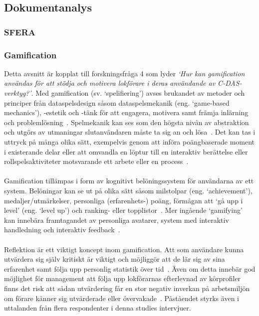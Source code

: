\subsection{Dokumentanalys}\label{subsec:dokumentanalys}
\subsubsection{SFERA}
\lipsum[1]
\subsubsection{Gamification}
Detta avsnitt är kopplat till forskningsfråga 4 som lyder \emph{\lq{}Hur kan gamification användas för att stödja och motivera lokförare i deras användande av C-DAS-verktyg?\rq{}}.
Med gamification (sv. \lq{}spelifiering\rq{}) avses brukandet av metoder och principer från dataspelsdesign såsom dataspelsmekanik (eng. \lq{}game-based mechanics\rq{}), -estetik och -tänk för att engagera, motivera samt främja inlärning och problemlösning~\cite{Bae2014, Cwil2018}.
Spelmekanik kan ses som den högsta nivån av abstraktion och utgörs av utmaningar slutanvändaren måste ta sig an och lösa~\cite{Cwil2018}.
Det kan tas i uttryck på många olika sätt, exempelvis genom att införa poängbaserade moment i existerande delar eller att omvandla en löptur till en interaktiv berättelse eller rollspelsaktiviteter motsvarande ett arbete eller en process~\cite{Bae2014}.
\paragraph{}
\hspace{-11}Gamification tillämpas i form av kognitivt belöningssystem för användarna av ett system.
Belöningar kan se ut på olika sätt såsom milstolpar (eng. \lq{}achievement\rq{}), medaljer/utmärkelser, personliga (erfarenhets-) poäng, förmågan att \lq{}gå upp i level\rq{} (eng. \lq{}level up\rq{}) och ranking- eller topplistor~\cite{Bae2014}.
Mer ingående \lq{}gamifying\rq{} kan innebära framtagandet av personliga avatarer, system med interaktiv handledning och interaktiv feedback~\cite{Bae2014, Cwil2018}.
\paragraph{}
\hspace{-11}Reflektion är ett viktigt koncept inom gamification.
Att som användare kunna utvärdera sig själv kritiskt är viktigt och möjliggör att de lär sig av sina erfarenhet samt följa upp personlig statistik över tid~\cite{Bae2014, Cwil2018}.
Även om detta innebär god möjlighet för management att följa upp lokförarnas efterlevnad av körprofiler finns det risk att sådan utvärdering får en stor negativ inverkan på arbetsmiljön om förare känner sig utvärderade eller övervakade~\cite{Bae2014}.
Påståendet styrks även i uttalanden från flera respondenter i denna studies intervjuer.
